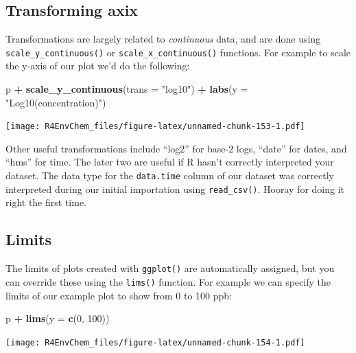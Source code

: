\documentclass[
]{book}
\newenvironment{Shaded}{\begin{snugshade}}{\end{snugshade}}
\newcommand{\AttributeTok}[1]{\textcolor[rgb]{0.13,0.29,0.53}{#1}}
\newcommand{\DecValTok}[1]{\textcolor[rgb]{0.00,0.00,0.81}{#1}}
\newcommand{\FunctionTok}[1]{\textcolor[rgb]{0.13,0.29,0.53}{\textbf{#1}}}
\newcommand{\NormalTok}[1]{#1}
\newcommand{\SpecialCharTok}[1]{\textcolor[rgb]{0.81,0.36,0.00}{\textbf{#1}}}
\newcommand{\StringTok}[1]{\textcolor[rgb]{0.31,0.60,0.02}{#1}}
\begin{document}
\hypertarget{transforming-axix}{%
\subsection{Transforming axix}\label{transforming-axix}}

Transformations are largely related to \emph{continuous} data, and are done using \texttt{scale\_y\_continuous()} or \texttt{scale\_x\_continuous()} functions. For example to scale the y-axis of our plot we'd do the following:

\begin{Shaded}
\begin{Highlighting}[]
\NormalTok{p }\SpecialCharTok{+}
  \FunctionTok{scale\_y\_continuous}\NormalTok{(}\AttributeTok{trans =} \StringTok{"log10"}\NormalTok{) }\SpecialCharTok{+}
  \FunctionTok{labs}\NormalTok{(}\AttributeTok{y =} \StringTok{"Log10(concentration)"}\NormalTok{)}
\end{Highlighting}
\end{Shaded}

\texttt{[image: R4EnvChem\_files/figure-latex/unnamed-chunk-153-1.pdf]}

Other useful transformations include ``log2'' for base-2 logs, ``date'' for dates, and ``hms'' for time. The later two are useful if R hasn't correctly interpreted your dataset. The data type for the \texttt{data.time} column of our dataset was correctly interpreted during our initial importation using \texttt{read\_csv()}. Hooray for doing it right the first time.

\hypertarget{limits}{%
\subsection{Limits}\label{limits}}

The limits of plots created with \texttt{ggplot()} are automatically assigned, but you can override these using the \texttt{lims()} function. For example we can specify the limits of our example plot to show from 0 to 100 ppb:

\begin{Shaded}
\begin{Highlighting}[]
\NormalTok{p }\SpecialCharTok{+} \FunctionTok{lims}\NormalTok{(}\AttributeTok{y =} \FunctionTok{c}\NormalTok{(}\DecValTok{0}\NormalTok{, }\DecValTok{100}\NormalTok{))}
\end{Highlighting}
\end{Shaded}

\texttt{[image: R4EnvChem\_files/figure-latex/unnamed-chunk-154-1.pdf]}
\end{document}
